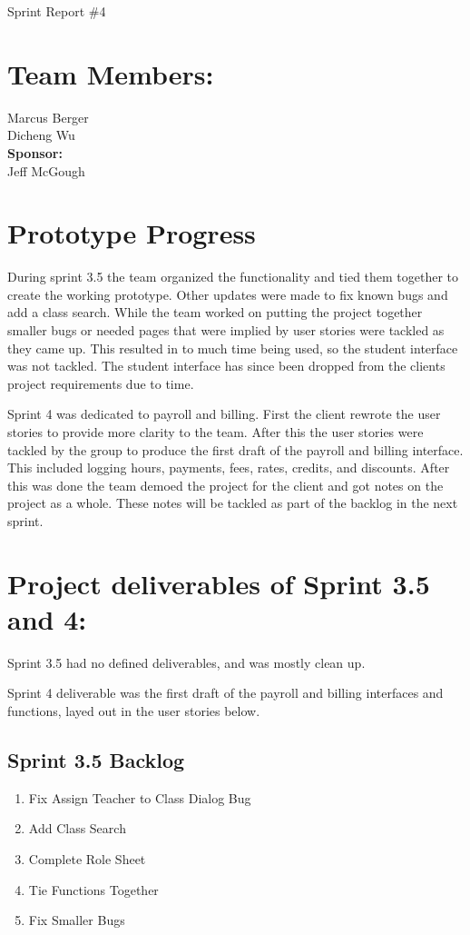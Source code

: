 \documentclass[11pt]{book}
\begin{document}
\fontsize{16}{16}\selectfont Sprint Report \#4


\section{Team Members:}
Marcus Berger
\\Dicheng Wu\\
\textbf{Sponsor:}
\\Jeff McGough
\\

\section{Prototype Progress}
During sprint 3.5 the team organized the functionality and tied them together to create the working prototype. Other updates were made to fix known bugs and add a class search. While the team worked on putting the project together smaller bugs or needed pages that were implied by user stories were tackled as they came up. This resulted in to much time being used, so the student interface was not tackled. The student interface has since been dropped from the clients project requirements due to time.

Sprint 4 was dedicated to payroll and billing. First the client rewrote the user stories to provide more clarity to the team. After this the user stories were tackled by the group to produce the first draft of the payroll and billing interface. This included logging hours, payments, fees, rates, credits, and discounts. After this was done the team demoed the project for the client and got notes on the project as a whole. These notes will be tackled as part of the backlog in the next sprint.


\section{Project deliverables of Sprint 3.5 and 4:}
Sprint 3.5 had no defined deliverables, and was mostly clean up.

Sprint 4 deliverable was the first draft of the payroll and billing interfaces and functions, layed out in the user stories below.



\subsection{Sprint 3.5 Backlog}

\begin{enumerate}
\item Fix Assign Teacher to Class Dialog Bug
\item Add Class Search
\item Complete Role Sheet
\item Tie Functions Together
\item Fix Smaller Bugs
\end{enumerate}
\end{document}
